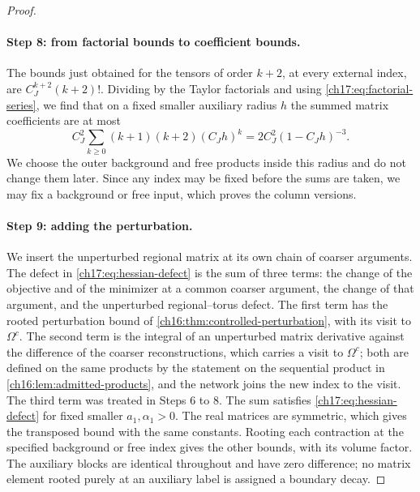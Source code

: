 \begin{proof}
\paragraph{Step 8: from factorial bounds to coefficient bounds.}
The bounds just obtained for the tensors of order $k+2$, at every external index, are $C_J^{k+2}(k+2)!$. Dividing by the Taylor factorials and using \eqref{ch17:eq:factorial-series}, we find that on a fixed smaller auxiliary radius $h$ the summed matrix coefficients are at most
\[
 C_J^2\sum_{k\ge0}(k+1)(k+2)(C_Jh)^k=2C_J^2(1-C_Jh)^{-3}.
\]
We choose the outer background and free products inside this radius and do not change them later. Since any index may be fixed before the sums are taken, we may fix a background or free input, which proves the column versions.

\paragraph{Step 9: adding the perturbation.}
We insert the unperturbed regional matrix at its own chain of coarser arguments. The defect in \eqref{ch17:eq:hessian-defect} is the sum of three terms: the change of the objective and of the minimizer at a common coarser argument, the change of that argument, and the unperturbed regional--torus defect. The first term has the rooted perturbation bound of \cref{ch16:thm:controlled-perturbation}, with its visit to $\Omega^c$. The second term is the integral of an unperturbed matrix derivative against the difference of the coarser reconstructions, which carries a visit to $\Omega^c$; both are defined on the same products by the statement on the sequential product in \cref{ch16:lem:admitted-products}, and the network joins the new index to the visit. The third term was treated in Steps 6 to 8. The sum satisfies \eqref{ch17:eq:hessian-defect} for fixed smaller $a_1,\alpha_1>0$. The real matrices are symmetric, which gives the transposed bound with the same constants. Rooting each contraction at the specified background or free index gives the other bounds, with its volume factor. The auxiliary blocks are identical throughout and have zero difference; no matrix element rooted purely at an auxiliary label is assigned a boundary decay.


\end{proof}
